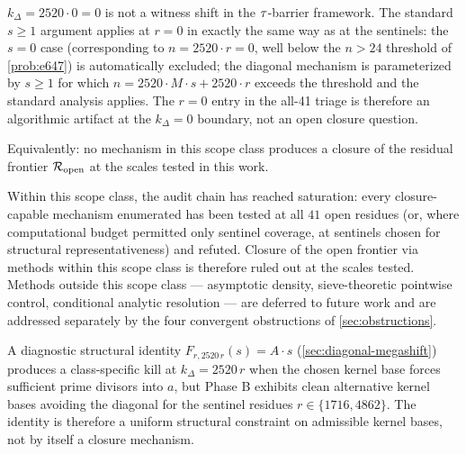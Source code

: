 \begin{theorem}
\begin{itemize}[leftmargin=*]
{  $k_\Delta = 2520 \cdot 0 = 0$ is not a witness shift in the
  $\tau$-barrier framework. The standard $s \ge 1$ argument applies
  at $r = 0$ in exactly the same way as at the sentinels: the
  $s = 0$ case (corresponding to $n = 2520 \cdot r = 0$, well below
  the $n > 24$ threshold of \cref{prob:e647}) is automatically
  excluded; the diagonal mechanism is parameterized by $s \ge 1$
  for which $n = 2520 \cdot M \cdot s + 2520 \cdot r$ exceeds the
  threshold and the standard analysis applies. The $r = 0$ entry in
  the all-41 triage is therefore an algorithmic artifact at the
  $k_\Delta = 0$ boundary, not an open closure question.}
\end{itemize}
Equivalently: no mechanism in this scope class produces a closure of
the residual frontier $\mathcal{R}_{\mathrm{open}}$ at the scales tested in this work.

Within this scope class, the audit chain has reached saturation:
every closure-capable mechanism enumerated has been tested at all
$41$ open residues (or, where computational budget permitted only
sentinel coverage, at sentinels chosen for structural
representativeness) and refuted. Closure of the open frontier via
methods within this scope class is therefore ruled out at the
scales tested. Methods outside this scope class --- asymptotic
density, sieve-theoretic pointwise control, conditional analytic
resolution --- are deferred to future work and are addressed
separately by the four convergent obstructions of
\cref{sec:obstructions}.

A diagnostic structural identity
$F_{r, 2520\, r}(s) = A \cdot s$ (\cref{sec:diagonal-megashift})
produces a class-specific kill at $k_\Delta = 2520\, r$ when the
chosen kernel base forces sufficient prime divisors into $a$, but
Phase B exhibits clean alternative kernel bases avoiding the
diagonal for the sentinel residues $r \in \{1716, 4862\}$. The
identity is therefore a uniform structural constraint on admissible
kernel bases, not by itself a closure mechanism.
\end{theorem}

